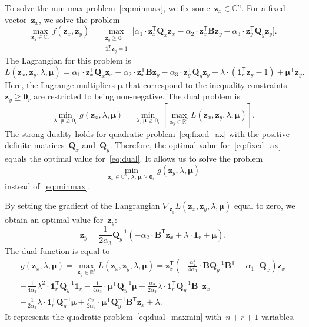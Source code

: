 \documentclass[preprint,authoryear,12pt]{elsarticle}
\theoremstyle{definition}
\newcommand{\bz}{\mathbf{z}}
\newcommand{\bB}{\mathbf{B}}
\newcommand{\bQ}{\mathbf{Q}}
\newcommand{\bbR}{\mathbb{R}}
\newcommand{\T}{\mathsf{T}}
\newcommand{\bmu}{\boldsymbol{\mu}}
\newcommand{\bOne}{\boldsymbol{1}}
\newcommand{\bZero}{\boldsymbol{0}}
\begin{document}
To solve the min-max problem~\eqref{eq:minmax}, we fix some~$\bz_x \in \mathbb{C}^n$. For a fixed vector~$\bz_x$, we solve the problem
\begin{equation}
\max_{\bz_y \in \mathbb{C}_r} f(\bz_x, \bz_y) = \max_{\substack{\bz_y \geq \bZero_r \\ \bOne_r^{\T}\bz_y=1}} \bigl[\alpha_1 \cdot \bz_x^{\T} \bQ_x \bz_x - \alpha_2 \cdot \bz_x^{\T} \bB \bz_y - \alpha_3 \cdot \bz_y^{\T} \bQ_y \bz_y \bigr].
\label{eq:fixed_ax}
\end{equation}
The Lagrangian for this problem is
\begin{equation*}
L(\bz_x, \bz_y, \lambda, \bmu) = \alpha_1 \cdot \bz_x^{\T} \bQ_x \bz_x - \alpha_2 \cdot \bz_x^{\T} \bB \bz_y - \alpha_3 \cdot \bz_y^{\T} \bQ_y \bz_y + \lambda \cdot  (\bOne_r^{\T} \bz_y - 1) + \bmu^{\T} \bz_y.
\end{equation*}
Here, the Lagrange multipliers $\bmu$ that correspond to the inequality constraints $\bz_y \geq \bZero_r$ are restricted to being non-negative.
The dual problem is
\begin{equation}
\min_{\lambda, \, \bmu \geq \bZero_r} g(\bz_x, \lambda, \bmu) = \min_{\lambda, \, \bmu \geq \bZero_r}  \left[\max_{\bz_y \in \bbR^r} L(\bz_x, \bz_y, \lambda, \bmu) \right].
\label{eq:dual}
\end{equation}
The strong duality holds for quadratic problem~\eqref{eq:fixed_ax} with the positive definite matrices~$\bQ_x$ and~$\bQ_y$. Therefore, the optimal value for~\eqref{eq:fixed_ax} equals the optimal value for~\eqref{eq:dual}. It allows us to solve the problem
\begin{equation}
\min_{\bz_x \in \mathbb{C}^n, \, \lambda, \, \bmu \geq \bZero_r} g(\bz_y, \lambda, \bmu)
\label{eq:dual_maxmin}
\end{equation}
instead of~\eqref{eq:minmax}.

By setting the gradient of the Langrangian $\nabla_{\bz_y} L(\bz_x, \bz_y, \lambda, \bmu)$ equal to zero, we obtain an optimal value for~$\bz_y$:
\begin{equation}
\bz_y = \frac{1}{2\alpha_3} \bQ_y^{-1} \left( - \alpha_2 \cdot \bB^{\T} \bz_x +\lambda \cdot \bOne_r + \bmu \right).
\label{eq:ax}
\end{equation}
The dual function is equal to
\begin{multline}
g(\bz_x, \lambda, \bmu)
= \max_{\bz_y \in \bbR^r} L(\bz_x, \bz_y, \lambda, \bmu) =
\bz_x^{\T} \left( - \frac{\alpha_2^2}{4\alpha_3} \cdot \bB \bQ_y^{-1} \bB^{\T} - \alpha_1 \cdot \bQ_x\right) \bz_x \\ - \frac{1}{4 \alpha_3} \lambda^2 \cdot \bOne_r^{\T} \bQ_y^{-1} \bOne_r - \frac{1}{4 \alpha_3} \cdot \bmu^{\T} \bQ_y^{-1} \bmu + \frac{\alpha_2}{2 \alpha_3} \lambda \cdot \bOne_r^{\T} \bQ_y^{-1} \bB^{\T} \bz_x \\ - \frac{1}{2 \alpha_3} \lambda \cdot \bOne_r^{\T} \bQ_y^{-1} \bmu + \frac{\alpha_2}{2 \alpha_3} \cdot \bmu^{\T} \bQ_y^{-1} \bB^{\T} \bz_x + \lambda.
\label{eq:dual_quadratic_form}
\end{multline}
It represents the quadratic problem~\eqref{eq:dual_maxmin} with~$n + r + 1$ variables.
\end{document}
